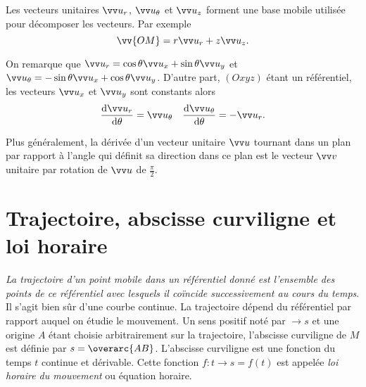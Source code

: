Les vecteurs unitaires $\ur$, $\utheta$ et $\uz$ forment une base mobile utilisée pour décomposer les vecteurs. Par exemple
\begin{equation}
  \vv{OM}=r \ur + z\uz.
\end{equation}

On remarque que $\ur = \cos \theta \ux + \sin \theta \uy$ et $\utheta = -\sin \theta \ux + \cos \theta \uy$. D'autre part, $(Oxyz)$ étant un référentiel, les vecteurs $\ux$ et $\uy$ sont constants alors
\begin{equation}
  \derived{\ur}{\theta} = \utheta \quad \derived{\utheta}{\theta} = -\ur.
\end{equation}

Plus généralement, la dérivée d'un vecteur unitaire $\vu$ tournant dans un plan par rapport à l'angle qui définit sa direction dans ce plan est le vecteur $\vvv$ unitaire par rotation de $\vu$ de $\frac{\pi}{2}$.


\section{Trajectoire, abscisse curviligne et loi horaire}
\label{chap1-sec:trajectoireabcissecurv}

\emph{La trajectoire d'un point mobile dans un référentiel donné est l'ensemble des points de ce référentiel avec lesquels il coïncide successivement au cours du temps}. Il s'agit bien sûr d'une courbe continue. La trajectoire dépend du référentiel par rapport auquel on étudie le mouvement. Un sens positif noté par $\rightarrow s$ et une origine $A$ étant choisie arbitrairement sur la trajectoire, l'abscisse curviligne de $M$ est définie par $s=\overarc{AB}$. L'abscisse curviligne est une fonction du temps $t$ continue et dérivable. Cette fonction $f:t \rightarrow s=f(t)$ est appelée \emph{loi horaire du mouvement} ou équation horaire.

